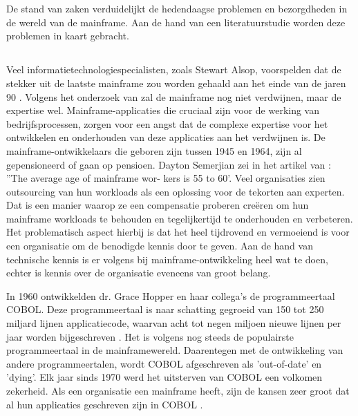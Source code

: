 \chapter{}
\label{ch:stand-van-zaken}



De stand van zaken verduidelijkt de hedendaagse problemen en bezorgdheden in de wereld van de mainframe. Aan de hand van een literatuurstudie worden deze problemen in kaart gebracht.

\section{}
\label{sec:Verdwijnen van expertise}

Veel informatietechnologiespecialisten, zoals Stewart Alsop, voorspelden dat de stekker uit de laatste mainframe zou worden gehaald aan het einde van de jaren 90 \autocite{McCracken2012}. Volgens het onderzoek van \textcite{Waites2013} zal de mainframe nog niet verdwijnen, maar de expertise wel. Mainframe-applicaties die cruciaal zijn voor de werking van bedrijfsprocessen, zorgen voor een angst dat de complexe expertise voor het ontwikkelen en onderhouden van deze applicaties aan het verdwijnen is. De mainframe-ontwikkelaars die geboren zijn tussen 1945 en 1964, zijn al gepensioneerd of gaan op pensioen. Dayton Semerjian zei in het artikel van \textcite{Waites2013}: ”The average age of mainframe wor- kers is 55 to 60’. Veel organisaties zien outsourcing van hun workloads als een oplossing voor de tekorten aan experten. Dat is een manier waarop ze een compensatie proberen creëren om hun mainframe workloads te behouden en tegelijkertijd te onderhouden en verbeteren. Het problematisch aspect hierbij is dat het heel tijdrovend en vermoeiend is voor een organisatie om de benodigde kennis door te geven. Aan de hand van technische kennis is er volgens \textcite{Waites2013} bij mainframe-ontwikkeling heel wat te doen, echter is kennis over de organisatie eveneens van groot belang.


In 1960 ontwikkelden dr. Grace Hopper en haar collega's de programmeertaal COBOL. Deze programmeertaal is naar schatting gegroeid van 150 tot 250 miljard lijnen applicatiecode, waarvan acht tot negen miljoen nieuwe lijnen per jaar worden bijgeschreven \autocite{Waites2013}. Het is volgens \textcite{Waites2013} nog steeds de populairste programmeertaal in de mainframewereld. Daarentegen met de ontwikkeling van andere programmeertalen, wordt COBOL afgeschreven als 'out-of-date' en 'dying'. Elk jaar sinds 1970 werd het uitsterven van COBOL een volkomen zekerheid. Als een organisatie een mainframe heeft, zijn de kansen zeer groot dat al hun applicaties geschreven zijn in COBOL \autocite{Waites2013}. 

